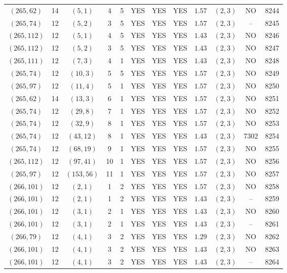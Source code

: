 \begin{longtable}{|c|c|c|c|c|c|c|c|c|c|c|c|}
$(265,62)$ & 14 & $(5,1)$ & 4 & 5 & YES & YES & YES & $1.57$ & $(2,3)$ & NO & 8244\\
$(265,74)$ & 12 & $(5,2)$ & 3 & 5 & YES & YES & YES & $1.57$ & $(2,3)$ & -- & 8245\\
$(265,112)$ & 12 & $(5,1)$ & 4 & 5 & YES & YES & YES & $1.43$ & $(2,3)$ & NO & 8246\\
$(265,112)$ & 12 & $(5,2)$ & 3 & 5 & YES & YES & YES & $1.43$ & $(2,3)$ & NO & 8247\\
$(265,111)$ & 12 & $(7,3)$ & 4 & 1 & YES & YES & YES & $1.43$ & $(2,3)$ & NO & 8248\\
$(265,74)$ & 12 & $(10,3)$ & 5 & 5 & YES & YES & YES & $1.57$ & $(2,3)$ & NO & 8249\\
$(265,97)$ & 12 & $(11,4)$ & 5 & 1 & YES & YES & YES & $1.57$ & $(2,3)$ & NO & 8250\\
$(265,62)$ & 14 & $(13,3)$ & 6 & 1 & YES & YES & YES & $1.57$ & $(2,3)$ & NO & 8251\\
$(265,74)$ & 12 & $(29,8)$ & 7 & 1 & YES & YES & YES & $1.57$ & $(2,3)$ & NO & 8252\\
$(265,74)$ & 12 & $(32,9)$ & 8 & 1 & YES & YES & YES & $1.57$ & $(2,3)$ & NO & 8253\\
$(265,74)$ & 12 & $(43,12)$ & 8 & 1 & YES & YES & YES & $1.43$ & $(2,3)$ & 7302 & 8254\\
$(265,74)$ & 12 & $(68,19)$ & 9 & 1 & YES & YES & YES & $1.57$ & $(2,3)$ & NO & 8255\\
$(265,112)$ & 12 & $(97,41)$ & 10 & 1 & YES & YES & YES & $1.57$ & $(2,3)$ & NO & 8256\\
$(265,97)$ & 12 & $(153,56)$ & 11 & 1 & YES & YES & YES & $1.57$ & $(2,3)$ & NO & 8257\\
$(266,101)$ & 12 & $(2,1)$ & 1 & 2 & YES & YES & YES & $1.57$ & $(2,3)$ & NO & 8258\\
$(266,101)$ & 12 & $(2,1)$ & 1 & 2 & YES & YES & YES & $1.43$ & $(2,3)$ & -- & 8259\\
$(266,101)$ & 12 & $(3,1)$ & 2 & 1 & YES & YES & YES & $1.43$ & $(2,3)$ & NO & 8260\\
$(266,101)$ & 12 & $(3,1)$ & 2 & 1 & YES & YES & YES & $1.43$ & $(2,3)$ & -- & 8261\\
$(266,79)$ & 12 & $(4,1)$ & 3 & 2 & YES & YES & YES & $1.29$ & $(2,3)$ & NO & 8262\\
$(266,101)$ & 12 & $(4,1)$ & 3 & 2 & YES & YES & YES & $1.43$ & $(2,3)$ & NO & 8263\\
$(266,101)$ & 12 & $(4,1)$ & 3 & 2 & YES & YES & YES & $1.43$ & $(2,3)$ & -- & 8264\\

\end{longtable}
